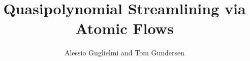 \documentclass[a4paper,11pt]{article}
\author{Alessio Guglielmi and Tom Gundersen}
\title{Quasipolynomial Streamlining via Atomic Flows}
\begin{document}


\maketitle










\small

\end{document}

